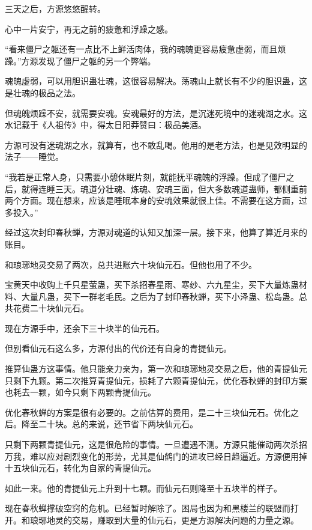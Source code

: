 
\begin{this_body}



三天之后，方源悠悠醒转。

心中一片安宁，再无之前的疲惫和浮躁之感。

“看来僵尸之躯还有一点比不上鲜活肉体，我的魂魄更容易疲惫虚弱，而且烦躁。”方源发现了僵尸之躯的另一个弊端。

魂魄虚弱，可以用胆识蛊壮魂，这很容易解决。荡魂山上就长有不少的胆识蛊，这是壮魂的极品之法。

但魂魄烦躁不安，就需要安魂。安魂最好的方法，是沉迷死境中的迷魂湖之水。这水记载于《人祖传》中，得太日阳莽赞曰：极品美酒。

方源可没有迷魂湖之水，就算有，也不敢乱喝。他用的是老方法，也是见效明显的法子——睡觉。

“我若是正常人身，只需要小憩休眠片刻，就能抚平魂魄的浮躁。但成了僵尸之后，就得连睡三天。魂道分壮魂、炼魂、安魂三面，但大多数魂道蛊师，都侧重前两个方面。现在想来，应该是睡眠本身的安魂效果就很上佳。不需要在这方面，过多投入。”

经过这次封印春秋蝉，方源对魂道的认知又加深一层。接下来，他算了算近月来的账目。

和琅琊地灵交易了两次，总共进账六十块仙元石。但他也用了不少。

宝黄天中收购上千只星萤蛊，买下杀招春星雨、寒纱、六九星尘，买下大量炼蛊材料、大量凡蛊，买下一群老毛民。之后为了封印春秋蝉，买下小泽蛊、松岛蛊。总共花费二十块仙元石。

现在方源手中，还余下三十块半的仙元石。

但别看仙元石这么多，方源付出的代价还有自身的青提仙元。

推算仙蛊方这事情。他只能亲力亲为，第一次和琅琊地灵交易之后，他的青提仙元只剩下九颗。第二次推算青提仙元，损耗了六颗青提仙元，优化春秋蝉的封印方案也耗去一颗，如今只剩下两颗青提仙元。

优化春秋蝉的方案是很有必要的。之前估算的费用，是二十三块仙元石。优化之后。降至二十块。总的来说，还节省下两块仙元石。

只剩下两颗青提仙元，这是很危险的事情。一旦遭遇不测。方源只能催动两次杀招万我，难以应对剧烈变化的形势，尤其是仙鹤门的进攻已经日趋逼近。方源便用掉十五块仙元石，转化为自家的青提仙元。

如此一来。他的青提仙元上升到十七颗。而仙元石则降至十五块半的样子。

现在春秋蝉撑破空窍的危机。已经暂时解除了。困局也因为和黑楼兰的联盟而打开。和琅琊地灵的交易，赚取到大量的仙元石，更是方源解决问题的力量之源。


\end{this_body}
